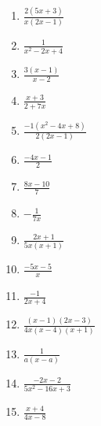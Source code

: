 \begin{multicols}{3}
\begin{enumerate}
\setlength\itemsep{10pt}
\item $\frac{2(5x+3)}{x(2x-1)}$
\item $\frac{1}{x^2-2x+4}$
\item $\frac{3(x-1)}{x-2}$
\item $\frac{x+3}{2+7x}$
\item $\frac{-1(x^2-4x+8)}{2(2x-1)}$
\item $\frac{-4x-1}{2}$
\item $\frac{8x-10}{7}$
\item $-\frac{1}{7x}$
\item $\frac{2x+1}{5x(x+1)}$
\item $\frac{-5x-5}{x}$
\item $\frac{-1}{2x+4}$
\item $\frac{(x-1)(2x-3)}{4x(x-4)(x+1)}$
\item $\frac{1}{a(x-a)}$
\item $\frac{-2x-2}{5x^2-16x+3}$
\item $\frac{x+4}{4x-8}$
\end{enumerate}
\end{multicols}